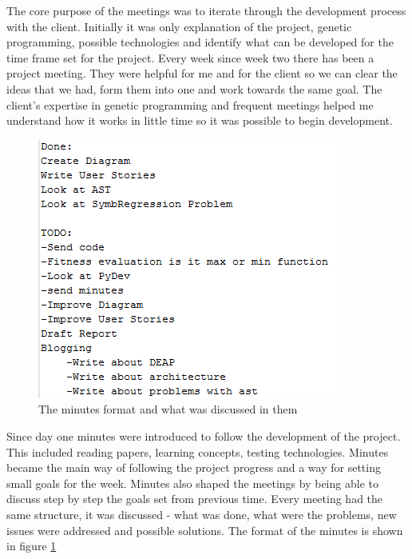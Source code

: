 The core purpose of the meetings was to iterate through the development process with the
client. Initially it was only explanation of the project, genetic programming, possible
technologies and identify what can be developed for the time frame set for the project.
Every week since week two there has been a project meeting. They were helpful for me and 
for the client so we can clear the ideas that we had, form them into one and work towards
the same goal. The client's expertise in genetic programming and frequent meetings helped me 
understand how it works in little time so it was possible to begin development.
\begin{figure}[htp]
\centering
\includegraphics[scale=0.8]{Figures/minutes.png}
\caption{The minutes format and what was discussed in them}
\label{fig:minutes}
\end{figure}
Since day one minutes were introduced to follow the development of the project. This included reading
papers, learning concepts, testing technologies. Minutes became the main way of following
the project progress and a way for setting small goals for the week. Minutes also shaped
the meetings by being able to discuss step by step the goals set from previous time. Every
meeting had the same structure, it was discussed - what was done, what were the problems, 
new issues were addressed and possible solutions. The format of the minutes is shown
in figure \ref{fig:minutes}
